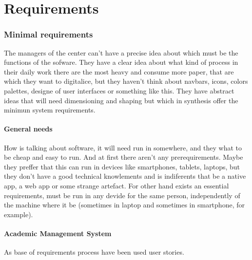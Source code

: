 \chapter{Requirements}



\subsection{Minimal requirements}

The managers of the center can't have a precise idea about which must be the functions of the sofware. They have a clear idea about what kind of process in their daily work there are the most heavy and consume more paper, that are which they want to digitalice, but they haven't think about navbars, icons, colors palettes, designe of user interfaces or something like this.  They have abstract ideas that will need dimensioning and shaping but which in synthesis offer the minimun system requirements.

\bigskip
\subsubsection{General needs}
\bigskip

How is talking about software, it will need run in somewhere, and they what to be cheap and easy to run. And at first there aren't any prerequirements. Maybe they preffer that this can run in devices like smartphones, tablets, laptops, but they don't have a good technical knowlements and is indiferents that be a native app, a web app or some strange artefact.
For other hand exists an essential requirements, must be run in any devide for the same person, independently of the machine where it be (sometimes in laptop and sometimes in smartphone, for example).

\bigskip
\subsubsection{Academic Management System}
\bigskip


As base of requirements process have been used user stories.

